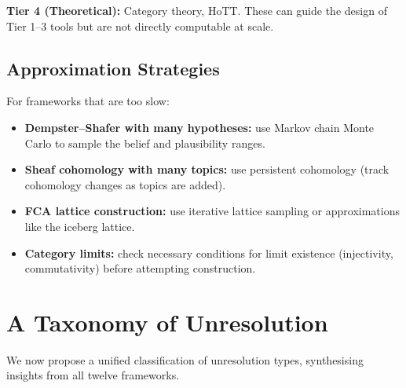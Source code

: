 \documentclass[11pt,letterpaper]{article}
\theoremstyle{definition}
\theoremstyle{remark}
\begin{document}
\textbf{Tier 4 (Theoretical):} Category theory, HoTT. These can guide the design of Tier 1--3 tools but are not directly computable at scale.

\subsection{Approximation Strategies}

For frameworks that are too slow:
\begin{itemize}
\item \textbf{Dempster--Shafer with many hypotheses:} use Markov chain Monte Carlo to sample the belief and plausibility ranges.
\item \textbf{Sheaf cohomology with many topics:} use persistent cohomology (track cohomology changes as topics are added).
\item \textbf{FCA lattice construction:} use iterative lattice sampling or approximations like the iceberg lattice.
\item \textbf{Category limits:} check necessary conditions for limit existence (injectivity, commutativity) before attempting construction.
\end{itemize}

\newpage

\section{A Taxonomy of Unresolution}
\label{sec:taxonomy}

We now propose a unified classification of unresolution types, synthesising insights from all twelve frameworks.
\end{document}
